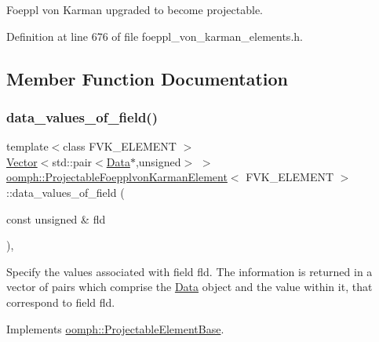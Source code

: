 Foeppl von Karman upgraded to become projectable. 

Definition at line 676 of file foeppl\+\_\+von\+\_\+karman\+\_\+elements.\+h.



\subsection{Member Function Documentation}
\mbox{\label{classoomph_1_1ProjectableFoepplvonKarmanElement_a945d9f6e4fe913ca3659b0aceaab9b94}} 
\subsubsection{\texorpdfstring{data\+\_\+values\+\_\+of\+\_\+field()}{data\_values\_of\_field()}}
{\footnotesize\ttfamily template$<$class F\+V\+K\+\_\+\+E\+L\+E\+M\+E\+NT $>$ \\
\hyperlink{classoomph_1_1Vector}{Vector}$<$std\+::pair$<$\hyperlink{classoomph_1_1Data}{Data}$\ast$,unsigned$>$ $>$ \hyperlink{classoomph_1_1ProjectableFoepplvonKarmanElement}{oomph\+::\+Projectable\+Foepplvon\+Karman\+Element}$<$ F\+V\+K\+\_\+\+E\+L\+E\+M\+E\+NT $>$\+::data\+\_\+values\+\_\+of\+\_\+field (\begin{DoxyParamCaption}\item[{const unsigned \&}]{fld }\end{DoxyParamCaption})\hspace{0.3cm}{\ttfamily [inline]}, {\ttfamily [virtual]}}



Specify the values associated with field fld. The information is returned in a vector of pairs which comprise the \hyperlink{classoomph_1_1Data}{Data} object and the value within it, that correspond to field fld. 



Implements \hyperlink{classoomph_1_1ProjectableElementBase_a644306ebdf16f334344c2d27d72f18b7}{oomph\+::\+Projectable\+Element\+Base}.



